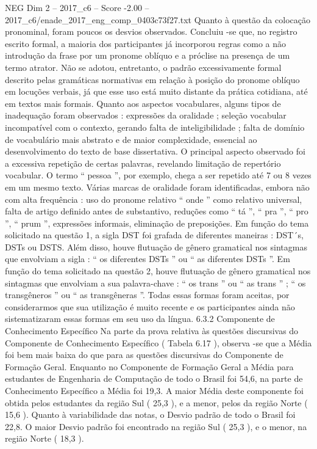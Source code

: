 \begin{textsample}{NEG Dim 2 – 2017\_c6 – Score -2.00 – 2017\_c6/enade\_2017\_eng\_comp\_0403c73f27.txt}
Quanto à questão da colocação pronominal, foram poucos os desvios observados.
Concluiu -se que, no registro escrito formal, a maioria dos participantes já incorporou regras como a não introdução da frase por um pronome oblíquo e a próclise na presença de um termo atrator.
Não se adotou, entretanto, o padrão excessivamente formal descrito pelas gramáticas normativas em relação à posição do pronome oblíquo em locuções verbais, já que esse uso está muito distante da prática cotidiana, até em textos mais formais.
Quanto aos aspectos vocabulares, alguns tipos de inadequação foram observados : expressões da oralidade ; seleção vocabular incompatível com o contexto, gerando falta de inteligibilidade ; falta de domínio de vocabulário mais abstrato e de maior complexidade, essencial ao desenvolvimento do texto de base dissertativa.
O principal aspecto observado foi a excessiva repetição de certas palavras, revelando limitação de repertório vocabular.
O termo “ pessoa ”, por exemplo, chega a ser repetido até 7 ou 8 vezes em um mesmo texto.
Várias marcas de oralidade foram identificadas, embora não com alta frequência : uso do pronome relativo “ onde ” como relativo universal, falta de artigo definido antes de substantivo, reduções como “ tá ”, “ pra ”, “ pro ”, “ prum ”, expressões informais, eliminação de preposições.
Em função do tema solicitado na questão 1, a sigla DST foi grafada de diferentes maneiras : DST´s, DSTs ou DSTS.
Além disso, houve flutuação de gênero gramatical nos sintagmas que envolviam a sigla : “ os diferentes DSTs ” ou “ as diferentes DSTs ”.
Em função do tema solicitado na questão 2, houve flutuação de gênero gramatical nos sintagmas que envolviam a sua palavra-chave : “ os trans ” ou “ as trans ” ; “ os transgêneros ” ou “ as transgêneras ”.
Todas essas formas foram aceitas, por considerarmos que sua utilização é muito recente e os participantes ainda não sistematizaram essas formas em seu uso da língua. 6.3.2 Componente de Conhecimento Específico Na parte da prova relativa às questões discursivas do Componente de Conhecimento Específico ( Tabela 6.17 ), observa -se que a Média foi bem mais baixa do que para as questões discursivas do Componente de Formação Geral.
Enquanto no Componente de Formação Geral a Média para estudantes de Engenharia de Computação de todo o Brasil foi 54,6, na parte de Conhecimento Específico a Média foi 19,3.
A maior Média deste componente foi obtida pelos estudantes da região Sul ( 25,3 ), e a menor, pelos da região Norte ( 15,6 ).
Quanto à variabilidade das notas, o Desvio padrão de todo o Brasil foi 22,8.
O maior Desvio padrão foi encontrado na região Sul ( 25,3 ), e o menor, na região Norte ( 18,3 ).

\end{textsample}
